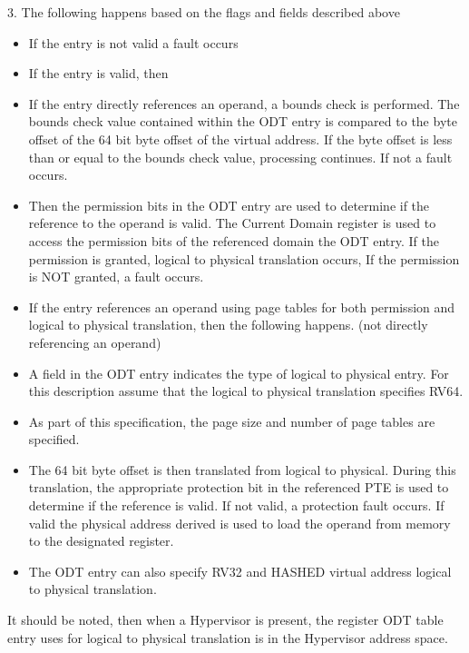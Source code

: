 \documentclass{article}
\begin{document}
\begin{appendices}
3.	The following happens based on the flags and fields described above
\begin{itemize}

\item If the entry is not valid a fault occurs
\item If the entry is  valid, then
\item If the entry directly references an operand, a  bounds check is performed.  The bounds check value contained within the ODT entry is compared to the byte offset of the 64 bit byte offset of the virtual address.  If the byte offset is less than or equal to the bounds check value, processing continues.  If not a fault occurs.
\item Then the permission  bits in the ODT entry are used to determine if the reference to the operand is valid.  The Current Domain register is used to access the permission bits of the referenced domain the ODT entry.  If the permission is granted,   logical to physical translation occurs,  If the permission is NOT granted,  a fault occurs.
\item If the entry references an operand using  page tables for both permission and logical to  physical translation,  then the following  happens. (not directly referencing an operand)
\item A field in the ODT entry indicates the type of logical to physical entry.  For this description assume that the logical to physical translation specifies RV64. 
\item As part of this specification,  the page size and number of page tables are specified.
\item The 64 bit byte offset is then translated from logical to physical.  During this translation,  the appropriate protection bit in the referenced PTE  is used to determine if the reference is valid.  If not valid,  a protection fault occurs. If valid the physical address derived is used to load the operand from memory to the designated register.
\item The ODT entry can also specify  RV32 and HASHED virtual address logical to physical  translation.

\end{itemize}




It should be noted,  then when a Hypervisor is present,  the register ODT table entry uses for logical to physical   translation is in the Hypervisor address space.  








\end{appendices}
\end{document}

